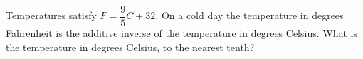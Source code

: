Temperatures satisfy $F=\dfrac95C+32$. On a cold day the temperature in degrees Fahrenheit is the additive inverse of the temperature in degrees Celsius. What is the temperature in degrees Celsius, to the nearest tenth?
